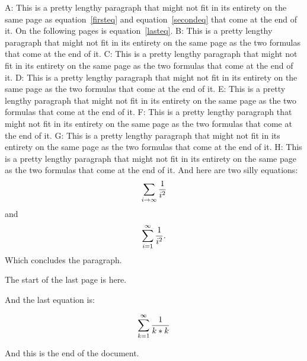 \documentclass[10pt]{article}
\begin{document}
\newpage
A: This is a pretty lengthy paragraph that might not fit
in its entirety on the same page as equation~\ref{firsteq}
and equation~\ref{secondeq} that come at the end of it.
On the following pages is equation~\ref{lasteq}.
B: This is a pretty lengthy paragraph that might not fit
in its entirety on the same page as the two formulas
that come at the end of it.
C: This is a pretty lengthy paragraph that might not fit
in its entirety on the same page as the two formulas
that come at the end of it.
D: This is a pretty lengthy paragraph that might not fit
in its entirety on the same page as the two formulas
that come at the end of it.
E: This is a pretty lengthy paragraph that might not fit
in its entirety on the same page as the two formulas
that come at the end of it.
F: This is a pretty lengthy paragraph that might not fit
in its entirety on the same page as the two formulas
that come at the end of it.
G: This is a pretty lengthy paragraph that might not fit
in its entirety on the same page as the two formulas
that come at the end of it.
H: This is a pretty lengthy paragraph that might not fit
in its entirety on the same page as the two formulas
that come at the end of it.
And here are two silly equations:
\begin{equation}
\sum_{i\to\infty}{1 \over i^2}\label{firsteq}
\end{equation}
and
\makeatletter
{}
\makeatletter
\begin{equation}
\sum_{i= 1}^\infty{1 \over i^2}.\label{secondeq}
\end{equation}
Which concludes the paragraph.

\newpage
The start of the last page is here.


And the last equation is: 

\begin{equation}
\sum_{k= 1}^\infty{1 \over k*k}\label{lasteq}
\end{equation}

And this is the end of the document.
\end{document}
